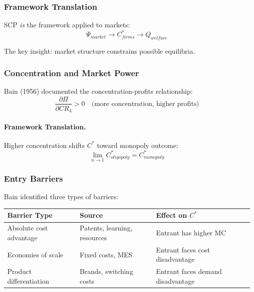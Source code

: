 \subsubsection{Framework Translation}

SCP \textit{is} the framework applied to markets:
\begin{equation}
\Psi_{market} \to C^*_{firms} \to Q_{welfare}
\end{equation}

The key insight: market structure constrains possible equilibria.

\subsubsection{Concentration and Market Power}

Bain (1956) documented the concentration-profits relationship:
\begin{equation}
\frac{\partial \Pi}{\partial CR_4} > 0 \quad \text{(more concentration, higher profits)}
\end{equation}

\paragraph{Framework Translation.}
Higher concentration shifts $C^*$ toward monopoly outcome:
\begin{equation}
\lim_{n \to 1} C^*_{oligopoly} = C^*_{monopoly}
\end{equation}

\subsubsection{Entry Barriers}

Bain identified three types of barriers:

\begin{center}
\renewcommand{\arraystretch}{1.3}
\begin{tabular}{|l|l|l|}
\hline
\textbf{Barrier Type} & \textbf{Source} & \textbf{Effect on $C^*$} \\
\hline
Absolute cost advantage & Patents, learning, resources & Entrant has higher MC \\
Economies of scale & Fixed costs, MES & Entrant faces cost disadvantage \\
Product differentiation & Brands, switching costs & Entrant faces demand disadvantage \\
\hline
\end{tabular}
\end{center}

